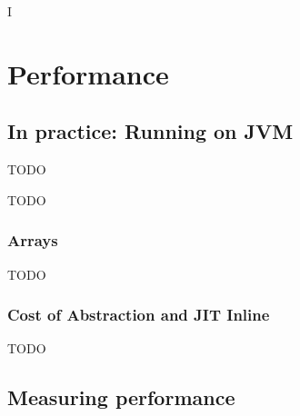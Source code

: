 I%

\chapter{Performance} %

\label{Performance} %



\section{In practice: Running on JVM}
\label{InPractice}

\color{red} TODO \color{black}

\color{red} TODO \color{black}

\subsection{Arrays}
\color{red} TODO \color{black}

\subsection{Cost of Abstraction and JIT Inline}
\color{red} TODO \color{black}



\section{Measuring performance}

